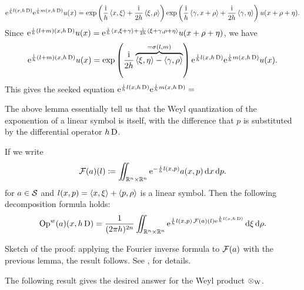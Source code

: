 \begin{prf}
\[
\mathrm{e}^{\frac{\mathrm{i}}{h}l(x,h\operatorname{D})}\mathrm{e}^{\frac{\mathrm{i}}{h}m(x,h\operatorname{D})}u(x)=\exp\left(\frac{\mathrm{i}}{h}\left< x,\xi\right>+\frac{\mathrm{i}}{2h}\left< \xi,\rho\right>\right)\exp\left(\frac{\mathrm{i}}{h}\left< \gamma,x+\rho\right>+\frac{\mathrm{i}}{2h}\left< \gamma,\eta\right>\right)u(x+\rho+\eta).
\]
Since $\mathrm{e}^{\frac{\mathrm{i}}{h}(l+m)(x,h\operatorname{D})}u(x)=\mathrm{e}^{\frac{\mathrm{i}}{h}\left< x,\xi+\gamma\right>+\frac{\mathrm{i}}{2h}\left< \xi+\gamma,\rho+\eta\right>}u(x+\rho+\eta)$, we have 
\[
\mathrm{e}^{\frac{\mathrm{i}}{h}(l+m)(x,h\operatorname{D})}u(x)=\exp\left(\frac{\mathrm{i}}{2h}\overbrace{\left< \xi,\eta\right>-\left< \gamma,\rho\right>}^{=\sigma(l,m)}\right)\mathrm{e}^{\frac{\mathrm{i}}{h}l(x,h\operatorname{D})}\mathrm{e}^{\frac{\mathrm{i}}{h}m(x,h\operatorname{D})}u(x).
\]
This gives the seeked equation $\mathrm{e}^{\frac{\mathrm{i}}{h}l(x,h\operatorname{D})}\mathrm{e}^{\frac{\mathrm{i}}{h}m(x,h\operatorname{D})}=$
\end{prf}

The above lemma essentially tell us that the Weyl quantization of the exponention of a linear symbol is itself, with the difference that $p$ is substituted by the differential operator $h\operatorname{D}$.


\begin{nlem}
\label{lem:fourier_decomp_op}
If we write
\[
\operatorname{\mathcal{F}}(a)(l)\coloneqq\iint_{\mathbb{R}^{n}\times\mathbb{R}^{n}}\mathrm{e}^{-\frac{\mathrm{i}}{h}l(x,p)}a(x,p)\mathop{}\!\mathrm{d} x\mathop{}\!\mathrm{d} p.
\]
for $a\in\mathcal{S}$ and $l(x,p)=\left< x,\xi\right>+\left< p,\rho\right>$ is a linear symbol. Then the following decomposition formula holds:
\[
\operatorname{Op}^{w}(a)(x,h\operatorname{D})=\frac{1}{(2\pi h)^{2n}}\iint_{\mathbb{R}^{n}\times\mathbb{R}^{n}}\mathrm{e}^{\frac{\mathrm{i}}{h}l(x,p)\operatorname{\mathcal{F}}(a)(l)\mathrm{e}^{\frac{\mathrm{i}}{h}l(x,h\operatorname{D})}}\mathop{}\!\mathrm{d}\xi\mathop{}\!\mathrm{d}\rho.
\]
\end{nlem}
\begin{prf}
Sketch of the proof: applying the Fourier inverse formula to $\operatorname{\mathcal{F}}(a)$ with the previous lemma, the result follows. See \cite{Zworski:semic}, \cite{Semy:lec_semi} for details.
\end{prf}

The following result gives the desired answer for the Weyl product $\operatorname{\otimes_{W}}$.



